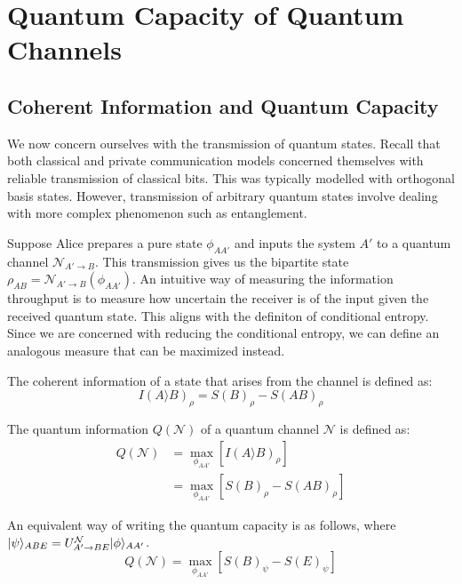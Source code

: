 \section{Quantum Capacity of Quantum Channels}

\subsection{Coherent Information and Quantum Capacity}

We now concern ourselves with the transmission of quantum states. Recall that both classical and private communication models concerned themselves with reliable transmission of classical bits. This was typically modelled with orthogonal basis states. However, transmission of arbitrary quantum states involve dealing with more complex phenomenon such as entanglement.

Suppose Alice prepares a pure state $\phi_{AA'}$ and inputs the system $A'$ to a quantum channel $\mathcal{N}_{A' \rightarrow B}$. This transmission gives us the bipartite state $\rho_{AB} = \mathcal{N}_{A' \rightarrow B} (\phi_{AA'})$. An intuitive way of measuring the information throughput is to measure how uncertain the receiver is of the input given the received quantum state. This aligns with the definiton of conditional entropy. Since we are concerned with reducing the conditional entropy, we can define an analogous measure that can be maximized instead.

\begin{definition}
The coherent information of a state that arises from the channel is defined as:
$$I(A \rangle B)_{\rho} = S(B)_{\rho} - S(AB)_{\rho}$$
\end{definition}

\begin{definition}
The quantum information $Q(\mathcal{N})$ of a quantum channel $\mathcal{N}$ is defined as:
\begin{align*}
Q(\mathcal{N}) &= \max_{\phi_{AA'}} \left[ I(A \rangle B)_{\rho} \right] \\
&= \max_{\phi_{AA'}} \left[ S(B)_\rho - S(AB)_\rho \right]
\end{align*}
\end{definition}

\noindent An equivalent way of writing the quantum capacity is as follows, where $\lvert\psi\rangle_{ABE} = U_{A' \rightarrow BE}^{\mathcal{N}} \lvert\phi\rangle_{AA'}$.
$$Q(\mathcal{N}) = \max_{\phi_{AA'}} \left[ S(B)_\psi - S(E)_\psi \right]$$

